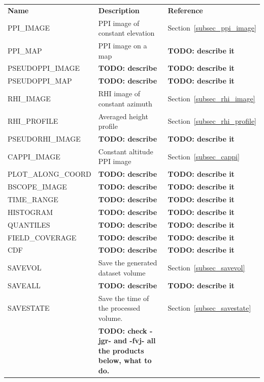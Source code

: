\documentclass[a4paper,11pt,pdftex,twoside]{scrartcl}
\renewcommand{\bf}{\normalfont \bfseries}
\begin{document}
{{{\begin{table}[H]
\begin{tabularx}{\textwidth}{lXl}
{\bf Name}      & {\bf Description}                      & {\bf Reference}\\
PPI\_IMAGE      & PPI image of constant elevation        & Section~\ref{subsec_ppi_image}\\
PPI\_MAP        & PPI image on a map                     & {\bf TODO: describe it} \\
PSEUDOPPI\_IMAGE  & {\bf TODO: describe}                 & {\bf TODO: describe it} \\
PSEUDOPPI\_MAP  & {\bf TODO: describe}                 & {\bf TODO: describe it} \\
RHI\_IMAGE      & RHI image of constant azimuth          & Section~\ref{subsec_rhi_image}\\
RHI\_PROFILE    & Averaged height profile                & Section~\ref{subsec_rhi_profile}\\
PSEUDORHI\_IMAGE   & {\bf TODO: describe}                 & {\bf TODO: describe it} \\
CAPPI\_IMAGE        & Constant altitude PPI image            & Section~\ref{subsec_cappi}\\
PLOT\_ALONG\_COORD & {\bf TODO: describe}                 & {\bf TODO: describe it} \\
BSCOPE\_IMAGE & {\bf TODO: describe}                 & {\bf TODO: describe it} \\
TIME\_RANGE & {\bf TODO: describe}                 & {\bf TODO: describe it} \\
HISTOGRAM & {\bf TODO: describe}                 & {\bf TODO: describe it} \\
QUANTILES & {\bf TODO: describe}                 & {\bf TODO: describe it} \\
FIELD\_COVERAGE & {\bf TODO: describe}                 & {\bf TODO: describe it} \\
CDF & {\bf TODO: describe}                 & {\bf TODO: describe it} \\
SAVEVOL         & Save the generated dataset volume        & Section~\ref{subsec_savevol}\\
SAVEALL & {\bf TODO: describe}                 & {\bf TODO: describe it} \\
SAVESTATE       & Save the time of the processed volume. & Section~\ref{subsec_savestate}\\
& {\bf TODO: check -jgr- and -fvj- all the products below, what to do.} & \\


\end{tabularx}
\end{table}}}}
\end{document}
